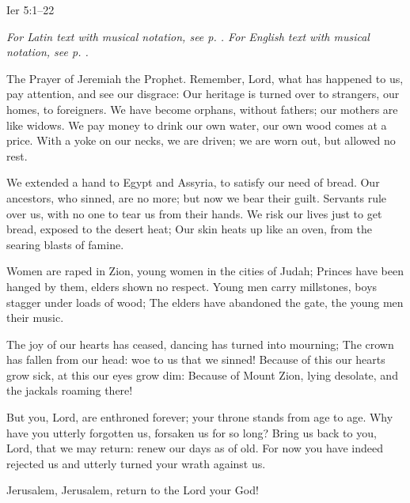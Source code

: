 \hfill Ier 5:1–22
\par\vspace{5pt}
\textit{For Latin text with musical notation, see p. \pageref{Oratio Ieremiæ}. For English text with musical notation, see p. \pageref{Prayer of Jeremiah}.}
\par\vspace{5pt}

The Prayer of Jeremiah the Prophet. Remember, Lord, what has happened to us,
    pay attention, and see our disgrace:
Our heritage is turned over to strangers,
    our homes, to foreigners.
We have become orphans, without fathers;
    our mothers are like widows.
We pay money to drink our own water,
    our own wood comes at a price.
With a yoke on our necks, we are driven;
    we are worn out, but allowed no rest.

We extended a hand to Egypt and Assyria,
    to satisfy our need of bread.
Our ancestors, who sinned, are no more;
    but now we bear their guilt.
Servants rule over us,
    with no one to tear us from their hands.
We risk our lives just to get bread,
    exposed to the desert heat;
Our skin heats up like an oven,
    from the searing blasts of famine.

Women are raped in Zion,
    young women in the cities of Judah;
Princes have been hanged by them,
    elders shown no respect.
Young men carry millstones,
    boys stagger under loads of wood;
The elders have abandoned the gate,
    the young men their music.

The joy of our hearts has ceased,
    dancing has turned into mourning;
The crown has fallen from our head:
    woe to us that we sinned!
Because of this our hearts grow sick,
    at this our eyes grow dim:
Because of Mount Zion, lying desolate,
    and the jackals roaming there!

But you, Lord, are enthroned forever;
    your throne stands from age to age.
Why have you utterly forgotten us,
    forsaken us for so long?
Bring us back to you, Lord, that we may return:
    renew our days as of old.
For now you have indeed rejected us
    and utterly turned your wrath against us.
    
    Jerusalem, Jerusalem, return to the Lord your God!
